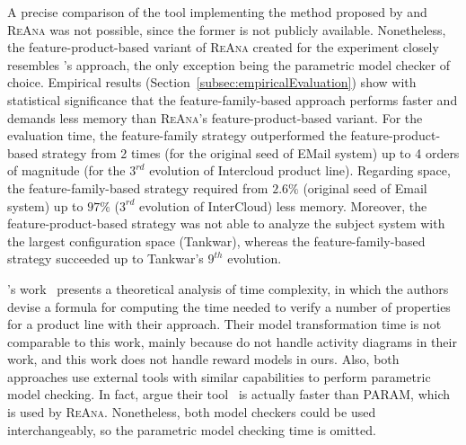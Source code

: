 A precise comparison of the tool implementing the method proposed by
\citeauthor{ghezzi_model-based_2013} and \textsc{ReAna} was not possible, since
the former is not publicly available.  Nonetheless, the feature-product-based
variant of \textsc{ReAna}  created for the experiment closely resembles
\citeauthor{ghezzi_model-based_2013}'s approach, the only exception being the
parametric model check\-er of choice.  Empirical results
(Section~\ref{subsec:empiricalEvaluation}) show with statistical significance
that the feature-family-based approach performs faster and demands less memory
than \textsc{ReAna}'s feature-product-based variant. For the evaluation time,
the feature-family strategy outperformed the feature-product-based strategy from
2 times (for the original seed of EMail system) up to 4 orders of magnitude (for
the $3^{rd}$ evolution of Intercloud product line). Regarding space, the
feature-family-based strategy required from $2.6\%$ (original seed of Email
system) up to $97\%$ ($3^{rd}$ evolution of InterCloud) less memory. Moreover,
the feature-product-based strategy was not able to analyze the subject system
with the largest configuration space (Tankwar), whereas the feature-family-based
strategy succeeded up to Tankwar's $9^{th}$ evolution.

\citeauthor{ghezzi_model-based_2013}'s work~\cite{ghezzi_model-based_2013}
presents a theoretical analysis of time complexity, in which the authors devise
a formula for computing the time needed to verify a number of properties for a
product line with their approach.  Their model transformation time is not
comparable to this work, mainly because \citeauthor{ghezzi_model-based_2013} do not
handle activity diagrams in their work, and this work does not handle reward models in
ours.  Also, both approaches use external tools with similar capabilities to
perform parametric model checking.  In fact,
\citeauthor{ghezzi_model-based_2013} argue their
tool~\cite{Filieri_pmctool_2012} is actually faster than PARAM, which is used by
\textsc{ReAna}.  Nonetheless, both model checkers could be used interchangeably,
so the parametric model checking time is omitted.

